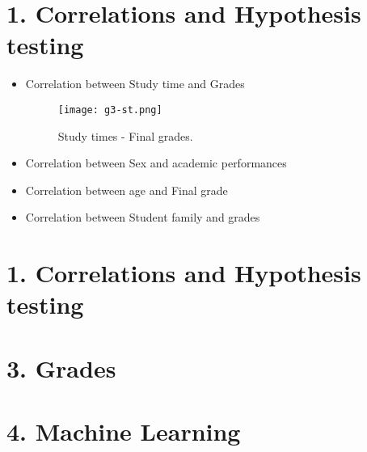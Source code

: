\documentclass[a4paper, 11pt]{report}
\theoremstyle{definition}
\numberwithin{equation}{section}		%
\numberwithin{figure}{section}			%
\numberwithin{table}{section}				%
\begin{document}
\section*{1. Correlations and Hypothesis testing}


\begin{itemize}
\item Correlation between Study time and Grades

\begin{figure}[h]\centering
\texttt{[image: g3-st.png]}
\caption{Study times - Final grades.}
\end{figure}


\item Correlation between Sex and academic performances


\item Correlation between age and Final grade


\item Correlation between Student family and grades


\end{itemize}




\section*{1. Correlations and Hypothesis testing}

\section*{3. Grades}


\section*{4. Machine Learning}
\end{document}
